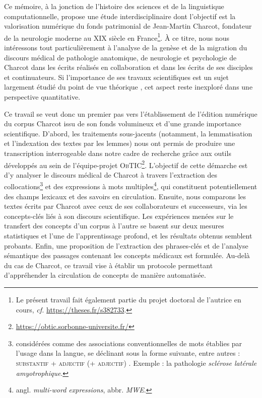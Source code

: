 \label{intro}
Ce mémoire, à la jonction de l'histoire des sciences et de la linguistique computationnelle, propose une étude interdisciplinaire dont l'objectif est la valorisation numérique du fonds patrimonial de Jean-Martin Charcot, fondateur de la neurologie moderne au XIX\ieme{} siècle en France\footnote{Le présent travail fait également partie du projet doctoral de l'autrice en cours, \textit{cf.} \url{https://theses.fr/s382733}.}. À ce titre, nous nous intéressons tout particulièrement à l'analyse de la genèse et de la migration du discours médical de pathologie anatomique, de neurologie et psychologie de Charcot dans les écrits réalisés en collaboration et dans les écrits de ses disciples et continuateurs. Si l'importance de ses travaux scientifiques est un sujet largement étudié du point de vue théorique \citep{bogousslavsky2011following,broussolle2012,camargo2024}, 
cet aspect reste inexploré dans une perspective quantitative.

Ce travail se veut donc un premier pas vers l'établissement de l'édition numérique du corpus Charcot issu de son fonds volumineux et d'une grande importance scientifique. D'abord, les traitements sous-jacents (notamment, la lemmatisation et l'indexation des textes par les lemmes) nous ont permis de produire une transcription interrogeable dans notre cadre de recherche grâce aux outils développés au sein de l'équipe-projet \textsc{ObTIC}\footnote{\url{https://obtic.sorbonne-universite.fr/}}. L'objectif de cette démarche est d'y analyser le discours médical de Charcot à travers l'extraction des collocations\footnote{considérées comme des \og{}associations conventionnelles de mots établies par l'usage dans la langue\fg{}, se déclinant sous la forme suivante, entre autres : \textsc{substantif + adjectif (+ adjectif)} \citep[p. 100]{nerima2006}. Exemple : la pathologie \textit{sclérose latérale amyotrophique}.} et des expressions à mots multiples\footnote{angl. \textit{multi-word expressions}, abbr. \textit{\textsc{MWE}}.}, qui constituent potentiellement des champs lexicaux et des savoirs en circulation. Ensuite, nous comparons les textes écrits par Charcot avec ceux de ses collaborateurs et successeurs, via les concepts-clés liés à son discours scientifique. Les expériences menées sur le transfert des concepts d'un corpus à l'autre se basent sur deux mesures statistiques et l'une de l'apprentissage profond, et les résultats obtenus semblent probants. Enfin, une proposition de l'extraction des phrases-clés et de l'analyse sémantique des passages contenant les concepts médicaux est formulée. Au-delà du cas de Charcot, ce travail vise à établir un protocole permettant d'appréhender la circulation de concepts de manière
automatisée.

